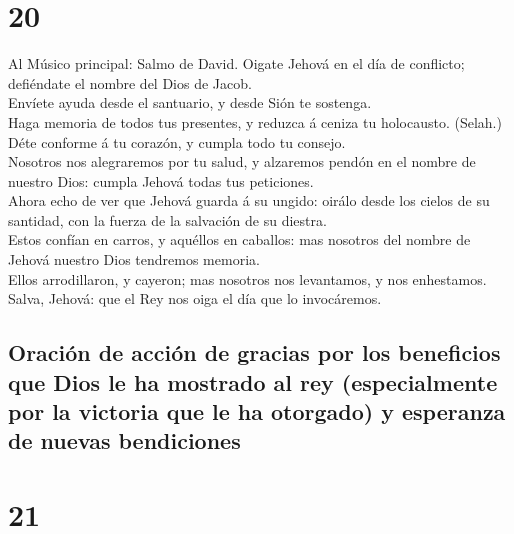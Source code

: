 \hypertarget{section-19-20}{%
\section{20}\label{section-19-20}}

 Al Músico principal: Salmo de David. Oigate Jehová en el
día de conflicto; defiéndate el nombre del Dios de Jacob.\\
 Envíete ayuda desde el santuario, y desde Sión te
sostenga.\\
 Haga memoria de todos tus presentes, y reduzca á ceniza
tu holocausto. (Selah.)\\
 Déte conforme á tu corazón, y cumpla todo tu consejo.\\
 Nosotros nos alegraremos por tu salud, y alzaremos pendón
en el nombre de nuestro Dios: cumpla Jehová todas tus peticiones.\\
 Ahora echo de ver que Jehová guarda á su ungido: oirálo
desde los cielos de su santidad, con la fuerza de la salvación de su
diestra.\\
 Estos confían en carros, y aquéllos en caballos: mas
nosotros del nombre de Jehová nuestro Dios tendremos memoria.\\
 Ellos arrodillaron, y cayeron; mas nosotros nos
levantamos, y nos enhestamos.\\
 Salva, Jehová: que el Rey nos oiga el día que lo
invocáremos.

\hypertarget{oraciuxf3n-de-acciuxf3n-de-gracias-por-los-beneficios-que-dios-le-ha-mostrado-al-rey-especialmente-por-la-victoria-que-le-ha-otorgado-y-esperanza-de-nuevas-bendiciones}{%
\subsection{Oración de acción de gracias por los beneficios que Dios le
ha mostrado al rey (especialmente por la victoria que le ha otorgado) y
esperanza de nuevas
bendiciones}\label{oraciuxf3n-de-acciuxf3n-de-gracias-por-los-beneficios-que-dios-le-ha-mostrado-al-rey-especialmente-por-la-victoria-que-le-ha-otorgado-y-esperanza-de-nuevas-bendiciones}}

\hypertarget{section-19-21}{%
\section{21}\label{section-19-21}}

